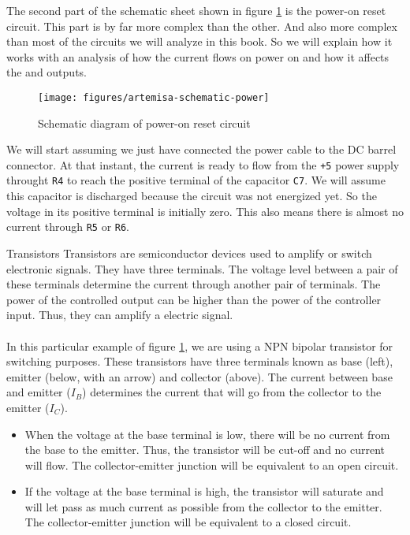 The second part of the schematic sheet shown in figure \ref{fig:artemisa-schematic-por} is the power-on reset circuit. This part is by far more complex than the other. And also more complex than most of the circuits we will analyze in this book. So we will explain how it works with an analysis of how the current flows on power on and how it affects the  and  outputs.

\begin{figure}[htbp]
  \centering
  \texttt{[image: figures/artemisa-schematic-power]}
  \caption{Schematic diagram of power-on reset circuit}
  \label{fig:artemisa-schematic-por}
\end{figure}

We will start assuming we just have connected the power cable to the DC barrel connector. At that instant, the current is ready to flow from the {\tt +5} power supply throught {\tt R4} to reach the positive terminal of the capacitor {\tt C7}. We will assume this capacitor is discharged because the circuit was not energized yet. So the voltage in its positive terminal is initially zero. This also means there is almost no current through {\tt R5} or {\tt R6}.

\begin{theory}[htbp]{Transistors}
  Transistors are semiconductor devices used to amplify or switch electronic signals. They have three terminals. The voltage level between a pair of these terminals determine the current through another pair of terminals. The power of the controlled output can be higher than the power of the controller input. Thus, they can amplify a electric signal.\\\\

  In this particular example of figure \ref{fig:artemisa-schematic-por}, we are using a NPN bipolar transistor for switching purposes. These transistors have three terminals known as base (left), emitter (below, with an arrow) and collector (above). The current between base and emitter ($I_B$) determines the current that will go from the collector to the emitter ($I_C$).

  \begin{itemize}
    \item When the voltage at the base terminal is low, there will be no current from the base to the emitter. Thus, the transistor will be cut-off and no current will flow. The collector-emitter junction will be equivalent to an open circuit.
    \item If the voltage at the base terminal is high, the transistor will saturate and will let pass as much current as possible from the collector to the emitter. The collector-emitter junction will be equivalent to a closed circuit.
  \end{itemize}

\end{theory}

